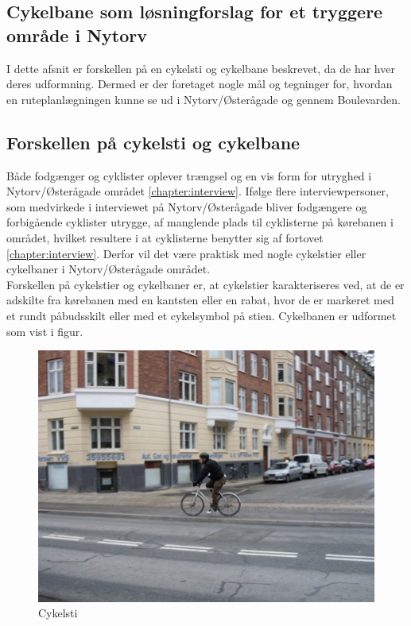 \subsection{Cykelbane som løsningforslag for et tryggere område i Nytorv}
\label{sub:Cykelbane_som_loesningforslag_for_et_tryggere_omraade_i_Nytorv}
I dette afsnit er forskellen på en cykelsti og cykelbane beskrevet, da de har hver deres udformning.  Dermed er der foretaget nogle mål og tegninger for, hvordan en ruteplanlægningen kunne se ud i Nytorv/Østerågade og gennem Boulevarden. 

\subsection{Forskellen på cykelsti og cykelbane}
\label{forskelpaacykelsti}
Både fodgænger og cyklister oplever trængsel og en vis form for utryghed i Nytorv/Østerågade området \cref{chapter:interview}. Ifølge flere interviewpersoner, som medvirkede i interviewet på Nytorv/Østerågade bliver fodgængere og forbigående cyklister utrygge, af manglende plads til cyklisterne på kørebanen i området, hvilket resultere i at cyklisterne benytter sig af fortovet \cref{chapter:interview}. Derfor vil det være praktisk med nogle cykelstier eller cykelbaner i Nytorv/Østerågade området.  
\\
Forskellen på cykelstier og cykelbaner er, at cykelstier karakteriseres ved, at de er adskilte fra kørebanen med en kantsten eller en rabat, hvor de er markeret med et rundt påbudsskilt eller med et cykelsymbol på stien. \autocite{vejdpdf}Cykelbanen er udformet som vist i figur.  



 \begin{figure}[htbp]
   \centering
   \begin{adjustbox}{max width=\textwidth}
     \includegraphics{figures/Billederogfigur/cykelsti.png}
  \end{adjustbox}
   \caption{Cykelsti}
    \label{fig:cykelsti}
 \end{figure}

